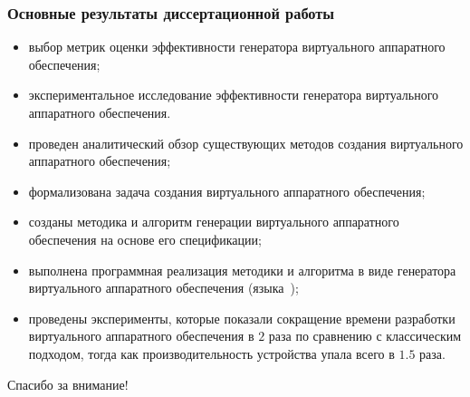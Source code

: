 \begin{frame}%
    \frametitle{Основные результаты диссертационной работы}
    \begin{itemize}
        \item выбор метрик оценки эффективности генератора виртуального аппаратного обеспечения;
        \item экспериментальное исследование эффективности генератора виртуального аппаратного обеспечения.

        \item проведен аналитический обзор существующих методов создания виртуального аппаратного обеспечения;
        \item формализована задача создания виртуального аппаратного обеспечения;
        \item созданы методика и алгоритм генерации виртуального аппаратного обеспечения на основе его спецификации;
        \item выполнена программная реализация методики и алгоритма в виде генератора
              виртуального аппаратного обеспечения \mbox{(языка {\mylanguage});}
        \item проведены эксперименты, которые показали сокращение времени разработки
              виртуального аппаратного обеспечения в $2$ раза по сравнению с классическим
              подходом, тогда как производительность устройства упала всего в $1.5$ раза.
    \end{itemize}
\end{frame}


\begin{frame}%
    \begin{center}
        \Huge Спасибо за внимание!
    \end{center}
\end{frame}
